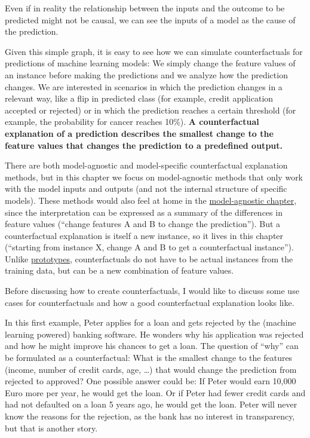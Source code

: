 \documentclass[
  12pt,
]{krantz}
\begin{document}
Even if in reality the relationship between the inputs and the outcome to be predicted might not be causal, we can see the inputs of a model as the cause of the prediction.

Given this simple graph, it is easy to see how we can simulate counterfactuals for predictions of machine learning models:
We simply change the feature values of an instance before making the predictions and we analyze how the prediction changes.
We are interested in scenarios in which the prediction changes in a relevant way, like a flip in predicted class (for example, credit application accepted or rejected) or in which the prediction reaches a certain threshold (for example, the probability for cancer reaches 10\%).
\textbf{A counterfactual explanation of a prediction describes the smallest change to the feature values that changes the prediction to a predefined output.}

There are both model-agnostic and model-specific counterfactual explanation methods, but in this chapter we focus on model-agnostic methods that only work with the model inputs and outputs (and not the internal structure of specific models).
These methods would also feel at home in the \protect\hyperlink{agnostic}{model-agnostic chapter}, since the interpretation can be expressed as a summary of the differences in feature values (``change features A and B to change the prediction'').
But a counterfactual explanation is itself a new instance, so it lives in this chapter (``starting from instance X, change A and B to get a counterfactual instance'').
Unlike \protect\hyperlink{proto}{prototypes}, counterfactuals do not have to be actual instances from the training data, but can be a new combination of feature values.

Before discussing how to create counterfactuals, I would like to discuss some use cases for counterfactuals and how a good counterfactual explanation looks like.

In this first example, Peter applies for a loan and gets rejected by the (machine learning powered) banking software.
He wonders why his application was rejected and how he might improve his chances to get a loan.
The question of ``why'' can be formulated as a counterfactual:
What is the smallest change to the features (income, number of credit cards, age, \ldots) that would change the prediction from rejected to approved?
One possible answer could be:
If Peter would earn 10,000 Euro more per year, he would get the loan.
Or if Peter had fewer credit cards and had not defaulted on a loan 5 years ago, he would get the loan.
Peter will never know the reasons for the rejection, as the bank has no interest in transparency, but that is another story.
\end{document}
